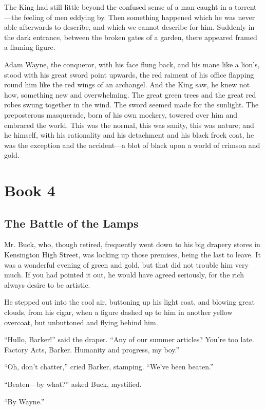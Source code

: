 \documentclass{book}
\begin{document}
The King had still little beyond the confused sense of a man caught in a torrent—the feeling of men eddying by. Then something happened which he was never able afterwards to describe, and which we cannot describe for him. Suddenly in the dark entrance, between the broken gates of a garden, there appeared framed a flaming figure.

Adam Wayne, the conqueror, with his face flung back, and his mane like a lion’s, stood with his great sword point upwards, the red raiment of his office flapping round him like the red wings of an archangel. And the King saw, he knew not how, something new and overwhelming. The great green trees and the great red robes swung together in the wind. The sword seemed made for the sunlight. The preposterous masquerade, born of his own mockery, towered over him and embraced the world. This was the normal, this was sanity, this was nature; and he himself, with his rationality and his detachment and his black frock coat, he was the exception and the accident—a blot of black upon a world of crimson and gold.

\setcounter{chapter}{0}\part*{Book 4}
\label{chapter-12}
\chapter{The Battle of the Lamps}
\label{chapter-13}
Mr. Buck, who, though retired, frequently went down to his big drapery stores in Kensington High Street, was locking up those premises, being the last to leave. It was a wonderful evening of green and gold, but that did not trouble him very much. If you had pointed it out, he would have agreed seriously, for the rich always desire to be artistic.

He stepped out into the cool air, buttoning up his light coat, and blowing great clouds, from his cigar, when a figure dashed up to him in another yellow overcoat, but unbuttoned and flying behind him.

“Hullo, Barker!” said the draper. “Any of our summer articles? You’re too late. Factory Acts, Barker. Humanity and progress, my boy.”

“Oh, don’t chatter,” cried Barker, stamping. “We’ve been beaten.”

“Beaten—by what?” asked Buck, mystified.

“By Wayne.”
\end{document}
